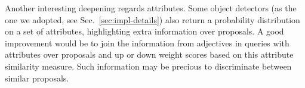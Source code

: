 Another interesting deepening regards attributes. Some object
detectors (as the one we adopted, see Sec.~\ref{sec:impl-details})
also return a probability distribution on a set of attributes,
highlighting extra information over proposals. A good improvement
would be to join the information from adjectives in queries with
attributes over proposals and up or down weight scores based on this
attribute similarity measure. Such information may be precious to
discriminate between similar proposals.
